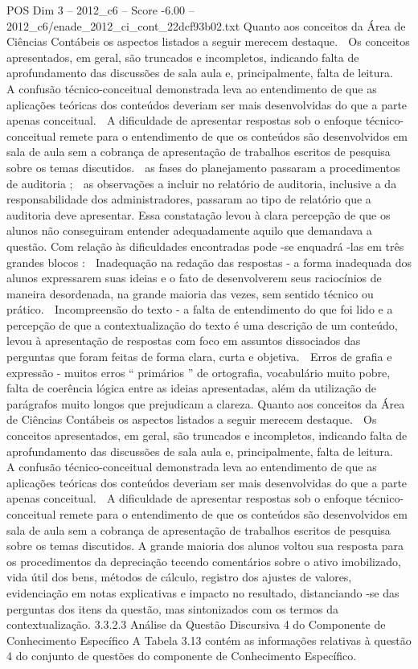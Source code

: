\begin{textsample}{POS Dim 3 – 2012\_c6 – Score -6.00 – 2012\_c6/enade\_2012\_ci\_cont\_22dcf93b02.txt}
Quanto aos conceitos da Área de Ciências Contábeis os aspectos listados a seguir merecem destaque.  Os conceitos apresentados, em geral, são truncados e incompletos, indicando falta de aprofundamento das discussões de sala aula e, principalmente, falta de leitura.  A confusão técnico-conceitual demonstrada leva ao entendimento de que as aplicações teóricas dos conteúdos deveriam ser mais desenvolvidas do que a parte apenas conceitual.  A dificuldade de apresentar respostas sob o enfoque técnico-conceitual remete para o entendimento de que os conteúdos são desenvolvidos em sala de aula sem a cobrança de apresentação de trabalhos escritos de pesquisa sobre os temas discutidos.  as fases do planejamento passaram a procedimentos de auditoria ;  as observações a incluir no relatório de auditoria, inclusive a da responsabilidade dos administradores, passaram ao tipo de relatório que a auditoria deve apresentar.
Essa constatação levou à clara percepção de que os alunos não conseguiram entender adequadamente aquilo que demandava a questão.
Com relação às dificuldades encontradas pode -se enquadrá -las em três grandes blocos :  Inadequação na redação das respostas - a forma inadequada dos alunos expressarem suas ideias e o fato de desenvolverem seus raciocínios de maneira desordenada, na grande maioria das vezes, sem sentido técnico ou prático.  Incompreensão do texto - a falta de entendimento do que foi lido e a percepção de que a contextualização do texto é uma descrição de um conteúdo, levou à apresentação de respostas com foco em assuntos dissociados das perguntas que foram feitas de forma clara, curta e objetiva.  Erros de grafia e expressão - muitos erros “ primários ” de ortografia, vocabulário muito pobre, falta de coerência lógica entre as ideias apresentadas, além da utilização de parágrafos muito longos que prejudicam a clareza.
Quanto aos conceitos da Área de Ciências Contábeis os aspectos listados a seguir merecem destaque.  Os conceitos apresentados, em geral, são truncados e incompletos, indicando falta de aprofundamento das discussões de sala aula e, principalmente, falta de leitura.  A confusão técnico-conceitual demonstrada leva ao entendimento de que as aplicações teóricas dos conteúdos deveriam ser mais desenvolvidas do que a parte apenas conceitual.  A dificuldade de apresentar respostas sob o enfoque técnico-conceitual remete para o entendimento de que os conteúdos são desenvolvidos em sala de aula sem a cobrança de apresentação de trabalhos escritos de pesquisa sobre os temas discutidos.
A grande maioria dos alunos voltou sua resposta para os procedimentos da depreciação tecendo comentários sobre o ativo imobilizado, vida útil dos bens, métodos de cálculo, registro dos ajustes de valores, evidenciação em notas explicativas e impacto no resultado, distanciando -se das perguntas dos itens da questão, mas sintonizados com os termos da contextualização. 3.3.2.3 Análise da Questão Discursiva 4 do Componente de Conhecimento Específico A Tabela 3.13 contém as informações relativas à questão 4 do conjunto de questões do componente de Conhecimento Específico.

\end{textsample}

